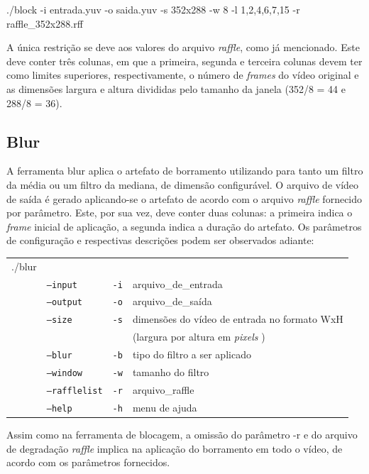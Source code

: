 ./block -i entrada.yuv -o saida.yuv -s 352x288 -w 8 -l 1,2,4,6,7,15 -r raffle\_352x288.rff

A única restrição se deve aos valores do arquivo \emph{raffle}, como já mencionado. Este deve conter três colunas, em que a primeira, segunda e terceira colunas devem ter como limites superiores, respectivamente, o número de \emph{frames} do vídeo original e as dimensões largura e altura divididas pelo tamanho da janela (352/8 = 44 e 288/8 = 36).

\subsection{Blur}

A ferramenta blur aplica o artefato de borramento utilizando para tanto um filtro da média ou um filtro da mediana, de dimensão configurável. O arquivo de vídeo de saída é gerado aplicando-se o artefato de acordo com o arquivo \emph{raffle} fornecido por parâmetro. Este, por sua vez, deve conter duas colunas: a primeira indica o \emph{frame} inicial de aplicação, a segunda indica a duração do artefato. Os parâmetros de configuração e respectivas descrições podem ser observados adiante:

\begin{table}[!h]
	\begin{tabular}{llll}
	./blur & & \\ 
	& \texttt{--input} & \texttt{-i}  & arquivo\_de\_entrada \\
	& \texttt{--output} & \texttt{-o}  & arquivo\_de\_saída \\
	& \texttt{--size} & \texttt{-s}  & dimensões do vídeo de entrada no formato WxH \\ 
	& & & (largura por altura em \emph{pixels} ) \\
	& \texttt{--blur} & \texttt{-b}  & tipo do filtro a ser aplicado \\
	& \texttt{--window} & \texttt{-w}  & tamanho do filtro \\
	& \texttt{--rafflelist} & \texttt{-r}  & arquivo\_raffle \\
	& \texttt{--help} & \texttt{-h}  & menu de ajuda \\
	\end{tabular}
\end{table}

Assim como na ferramenta de blocagem, a omissão do parâmetro -r e do arquivo de degradação \emph{raffle} implica na aplicação do borramento em todo o vídeo, de acordo com os parâmetros fornecidos.

